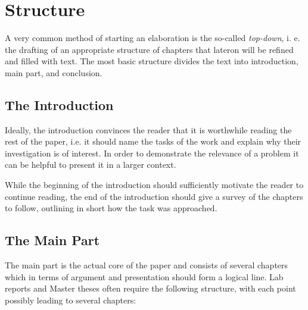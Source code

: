\chapter{Structure}

A very common method of starting an elaboration is the so-called \emph{top-down},
i. e. the drafting of an appropriate structure of chapters that lateron will
be refined and filled with text. The most basic structure divides the text
into introduction, main part, and conclusion.
 

\section{The Introduction}

Ideally, the introduction convinces the reader that it is worthwhile reading the
rest of the paper, i.e. it should name the tasks of the work and explain
why their investigation is of interest. In order to demonstrate the relevance
of a problem it can be helpful to present it in a larger context.

While the beginning of the introduction should sufficiently motivate the reader 
to continue reading, the end of the introduction should give a survey of the
chapters to follow, outlining in short how the task was approached.


\section{The Main Part}

The main part is the actual core of the paper and consists of several chapters
which in terms of argument and presentation should form a logical line.
Lab reports and Master theses often require the following structure, with each
point possibly leading to several chapters:


